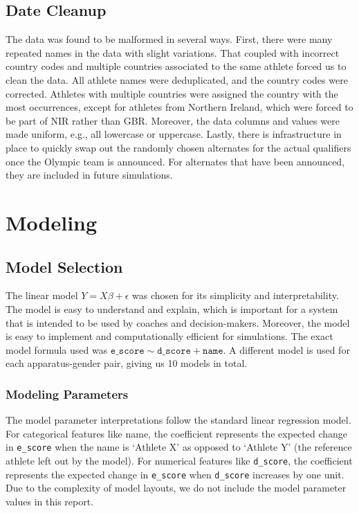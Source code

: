 \documentclass{article}
\begin{document}
\subsection{Date Cleanup}
The data was found to be malformed in several ways. First, there were many repeated 
names in the data with slight variations. That coupled with incorrect country codes 
and multiple countries associated to the same athlete forced us to clean the data. 
All athlete names were deduplicated, and the country codes were corrected. 
Athletes with multiple countries were assigned the country with the most occurrences, 
except for athletes from Northern Ireland, which were forced to be part of NIR rather 
than GBR. Moreover, the data columns and values were made uniform, e.g., all lowercase 
or uppercase. Lastly, there is infrastructure in place to quickly swap out the randomly 
chosen alternates for the actual qualifiers once the Olympic team is announced. For 
alternates that have been announced, they are included in future simulations. 

\section{Modeling}\label{sec:modeling}

\subsection{Model Selection}
The linear model $Y = X\beta + \epsilon$ was chosen for its simplicity and interpretability. 
The model is easy to understand and explain, which is important for a system that is
intended to be used by coaches and decision-makers. Moreover, the model is easy to
implement and computationally efficient for simulations. The exact model formula used 
was $\texttt{e\_score} \sim \texttt{d\_score} + \texttt{name}$. A different model is 
used for each apparatus-gender pair, giving us 10 models in total.

\subsubsection{Modeling Parameters}
The model parameter interpretations follow the standard linear regression model. 
For categorical features like name, the coefficient represents the expected change 
in \texttt{e\_score} when the name is `Athlete X' as opposed to `Athlete Y' (the 
reference athlete left out by the model). For numerical features like \texttt{d\_score},
the coefficient represents the expected change in \texttt{e\_score} when \texttt{d\_score} increases 
by one unit. Due to the complexity of model layouts, we do not include the model 
parameter values in this report. 
\end{document}
